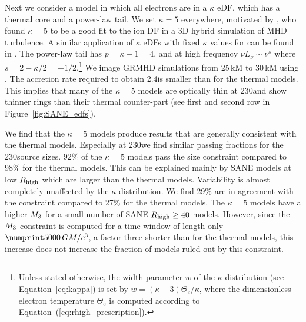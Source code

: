 Next we consider a model in which all electrons are in a $\kappa$ eDF, which has a thermal core and a power-law tail.
We set $\kappa = 5$ everywhere,  motivated by \citet{2016PhRvL.117w5101K}, who found $\kappa = 5$ to be a good fit to the ion DF in a 3D hybrid simulation of MHD turbulence.
A similar application of $\kappa$ eDFs with fixed $\kappa$ values for \sgra can be found in \citet{2018A&A...612A..34D}.
The power-law tail has $p = \kappa - 1 = 4$, and at high frequency $\nu L_\nu \sim \nu^s$ where $s = 2 - \kappa/2 = -1/2$.\footnote{Unless stated otherwise, the width parameter $w$ of the $\kappa$ distribution (see Equation~\ref{eq:kappa}) is set by $w = (\kappa - 3) \Theta_e/\kappa$, where the dimensionless electron temperature $\Theta_e$ is computed according to Equation~(\ref{eq:rhigh_prescription}).}
We image \bhac GRMHD simulations from 25\,kM to 30\,kM using \bhoss \citep{Younsi2012,Younsi2020}.
The accretion rate required to obtain 2.4\Jy is smaller than for the thermal models.
This implies that many of the $\kappa=5$ models are optically thin at 230\GHz and show thinner rings than their thermal counter-part (see first and second row in Figure~\ref{fig:SANE_edfs}).


We find that the $\kappa=5$ models produce results that are generally consistent with the \bhac thermal models.
Especially at 230\GHz we find similar passing fractions for the 230\GHz source sizes.
92\% of the $\kappa=5$ models pass the size constraint compared to 98\% for the thermal models.
This can be explained mainly by SANE models at low $R_\mathrm{high}$ which are larger than the thermal models.
Variability is almost completely unaffected by the $\kappa$ distribution.
We find 29\% are in agreement with the  constraint compared to 27\% for the thermal models.
The $\kappa=5$ models have a higher $M_{3}$ for a small number of SANE $R_\mathrm{high} \geq 40$ models.
However, since the $M_{3}$ constraint is computed for a time window of length only $\no{5000}\,\tg$, a factor three shorter than for the thermal models, this increase does not increase the fraction of models ruled out by this constraint.

